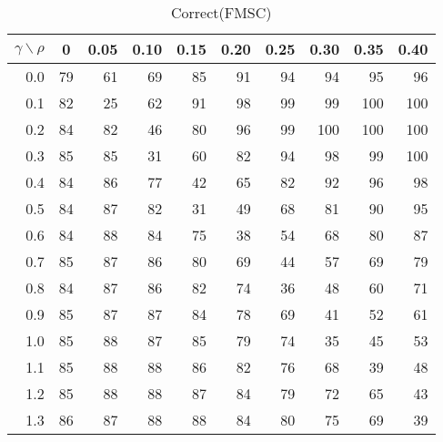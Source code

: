 \documentclass[12pt]{article}
\begin{document}
%


\begin{table}[!tbp]
\caption{Correct(FMSC)}
 \begin{center}
 \begin{tabular}{r|rrrrrrrrr}\hline\hline
\multicolumn{1}{c|}{$\gamma\backslash\rho$}&\multicolumn{1}{c}{0}&\multicolumn{1}{c}{0.05}&\multicolumn{1}{c}{0.10}&\multicolumn{1}{c}{0.15}&\multicolumn{1}{c}{0.20}&\multicolumn{1}{c}{0.25}&\multicolumn{1}{c}{0.30}&\multicolumn{1}{c}{0.35}&\multicolumn{1}{c}{0.40}\tabularnewline
\hline




0.0&79&61&69&85&91&94& 94& 95& 96\tabularnewline
0.1&82&25&62&91&98&99& 99&100&100\tabularnewline
0.2&84&82&46&80&96&99&100&100&100\tabularnewline
0.3&85&85&31&60&82&94& 98& 99&100\tabularnewline
0.4&84&86&77&42&65&82& 92& 96& 98\tabularnewline
0.5&84&87&82&31&49&68& 81& 90& 95\tabularnewline
0.6&84&88&84&75&38&54& 68& 80& 87\tabularnewline
0.7&85&87&86&80&69&44& 57& 69& 79\tabularnewline
0.8&84&87&86&82&74&36& 48& 60& 71\tabularnewline
0.9&85&87&87&84&78&69& 41& 52& 61\tabularnewline
1.0&85&88&87&85&79&74& 35& 45& 53\tabularnewline
1.1&85&88&88&86&82&76& 68& 39& 48\tabularnewline
1.2&85&88&88&87&84&79& 72& 65& 43\tabularnewline
1.3&86&87&88&88&84&80& 75& 69& 39\tabularnewline
\hline
\end{tabular}

\end{center}

\end{table}

%
\end{document}
